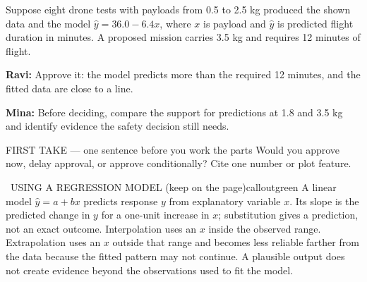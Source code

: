 \documentclass[11pt]{article}
\begin{document}


Suppose eight drone tests with payloads from 0.5 to 2.5 kg produced the shown data and the model $\hat y=36.0-6.4x$, where $x$ is payload and $\hat y$ is predicted flight duration in minutes. A proposed mission carries 3.5 kg and requires 12 minutes of flight.\par\smallskip \textbf{Ravi:} Approve it: the model predicts more than the required 12 minutes, and the fitted data are close to a line.\par \textbf{Mina:} Before deciding, compare the support for predictions at 1.8 and 3.5 kg and identify evidence the safety decision still needs.\par
\begin{center}
\end{center}
\begin{firsttakebox}{FIRST TAKE --- one sentence before you work the parts}
Would you approve now, delay approval, or approve conditionally? Cite one number or plot feature.
\workspace{0.85in}
\end{firsttakebox}

\begin{callout}{\IconBook\ USING A REGRESSION MODEL (keep on the page)}{calloutgreen}
A linear model $\hat y=a+bx$ predicts response $y$ from explanatory variable $x$.
Its slope is the predicted change in $y$ for a one-unit increase in $x$; substitution
gives a prediction, not an exact outcome. Interpolation uses an $x$ inside the observed
range. Extrapolation uses an $x$ outside that range and becomes less reliable farther
from the data because the fitted pattern may not continue. A plausible output does not
create evidence beyond the observations used to fit the model.
\end{callout}
\end{document}
